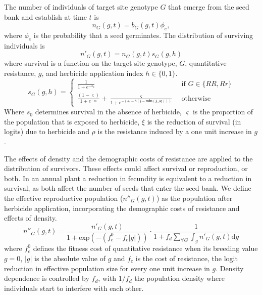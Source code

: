 \documentclass[10pt,letterpaper]{article}
\begin{document}
The number of individuals of target site genotype $G$ that emerge from the seed bank and establish at time $t$ is 
\begin{equation}\label{eq:above_ground}
	n_G(g, t) = b_G(g, t)\phi_e,
\end{equation}
where $\phi_e$ is the probability that a seed germinates. The distribution of surviving individuals is 
\begin{equation}\label{eq:abg_sur}
	n'_G(g, t) = n_G(g, t)s_G(g, h) 
\end{equation}
where survival is a function on the target site genotype, $G$, quantitative resistance, $g$, and herbicide application index $h \in \{0, 1\}$.   
\begin{equation}\label{eq:sur_G}
	s_G(g, h) = \begin{cases} 
		\frac{1}{1 + e^{-s_0}} &\text{~if~} G \in \{RR, Rr\} \\
		\frac{(1 - \varsigma)}{1 + e^{-s_0}} + \frac{\varsigma}{1 + e^{-\left(s_0 - h\left(\xi - \textbf{min}(\xi, \rho g) \right)\right)}} &\text{~otherwise~} 		
	\end{cases} 
\end{equation}  
Where $s_0$ determines survival in the absence of herbicide, $\varsigma$ is the proportion of the population that is exposed to herbicide, $\xi$ is the reduction of survival (in logits) due to herbicide and $\rho$ is the resistance induced by a one unit increase in $g$.   

The effects of density and the demographic costs of resistance are applied to the distribution of survivors. These effects could affect survival or reproduction, or both. In an annual plant a reduction in fecundity is equivalent to a reduction in survival, as both affect the number of seeds that enter the seed bank. We define the effective reproductive population ($n''_G(g, t)$) as the population after herbicide application, incorporating the demographic costs of resistance and effects of density. 
\begin{equation}\label{eq:effect_pop}
	n''_G(g, t) = \frac{n'_G(g, t)}{1 + \text{exp}(-(f_c^0 - f_c|g|))}\cdot\frac{1}{1 + f_d\sum_{\forall G} \int_g n'_G(g, t)\text{d}g}
\end{equation} 
where $f_c^0$ defines the fitness cost of quantitative resistance when its breeding value $g = 0$, $|g|$ is the absolute value of $g$ and $f_c$ is the cost of resistance, the logit reduction in effective population size for every one unit increase in $g$. Density dependence is controlled by $f_d$, with $1/f_d$ the population density where individuals start to interfere with each other. 
\end{document}
